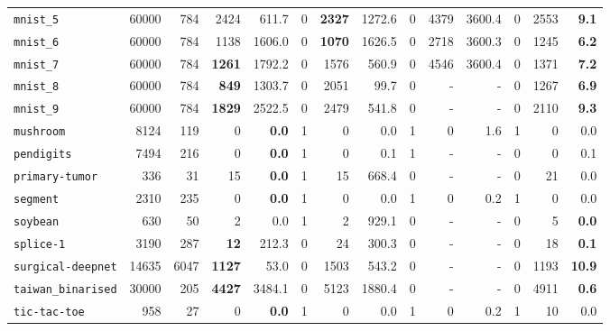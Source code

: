 \begin{tabular}{lccrrrrrrrrrrr}
\texttt{mnist\_5} & \multicolumn{1}{r}{60000} & \multicolumn{1}{r}{784}  & 2424 & 611.7 & 0 & \textbf{2327} & 1272.6 & 0 & 4379 & 3600.4 & 0 & 2553 & \textbf{9.1}\\
\texttt{mnist\_6} & \multicolumn{1}{r}{60000} & \multicolumn{1}{r}{784}  & 1138 & 1606.0 & 0 & \textbf{1070} & 1626.5 & 0 & 2718 & 3600.3 & 0 & 1245 & \textbf{6.2}\\
\texttt{mnist\_7} & \multicolumn{1}{r}{60000} & \multicolumn{1}{r}{784}  & \textbf{1261} & 1792.2 & 0 & 1576 & 560.9 & 0 & 4546 & 3600.4 & 0 & 1371 & \textbf{7.2}\\
\texttt{mnist\_8} & \multicolumn{1}{r}{60000} & \multicolumn{1}{r}{784}  & \textbf{849} & 1303.7 & 0 & 2051 & 99.7 & 0 & - & - & 0 & 1267 & \textbf{6.9}\\
\texttt{mnist\_9} & \multicolumn{1}{r}{60000} & \multicolumn{1}{r}{784}  & \textbf{1829} & 2522.5 & 0 & 2479 & 541.8 & 0 & - & - & 0 & 2110 & \textbf{9.3}\\
\texttt{mushroom} & \multicolumn{1}{r}{8124} & \multicolumn{1}{r}{119}  & 0 & \textbf{0.0} & 1 & 0 & 0.0 & 1 & 0 & 1.6 & 1 & 0 & 0.0\\
\texttt{pendigits} & \multicolumn{1}{r}{7494} & \multicolumn{1}{r}{216}  & 0 & \textbf{0.0} & 1 & 0 & 0.1 & 1 & - & - & 0 & 0 & 0.1\\
\texttt{primary-tumor} & \multicolumn{1}{r}{336} & \multicolumn{1}{r}{31}  & 15 & \textbf{0.0} & 1 & 15 & 668.4 & 0 & - & - & 0 & 21 & 0.0\\
\texttt{segment} & \multicolumn{1}{r}{2310} & \multicolumn{1}{r}{235}  & 0 & \textbf{0.0} & 1 & 0 & 0.0 & 1 & 0 & 0.2 & 1 & 0 & 0.0\\
\texttt{soybean} & \multicolumn{1}{r}{630} & \multicolumn{1}{r}{50}  & 2 & 0.0 & 1 & 2 & 929.1 & 0 & - & - & 0 & 5 & \textbf{0.0}\\
\texttt{splice-1} & \multicolumn{1}{r}{3190} & \multicolumn{1}{r}{287}  & \textbf{12} & 212.3 & 0 & 24 & 300.3 & 0 & - & - & 0 & 18 & \textbf{0.1}\\
\texttt{surgical-deepnet} & \multicolumn{1}{r}{14635} & \multicolumn{1}{r}{6047}  & \textbf{1127} & 53.0 & 0 & 1503 & 543.2 & 0 & - & - & 0 & 1193 & \textbf{10.9}\\
\texttt{taiwan\_binarised} & \multicolumn{1}{r}{30000} & \multicolumn{1}{r}{205}  & \textbf{4427} & 3484.1 & 0 & 5123 & 1880.4 & 0 & - & - & 0 & 4911 & \textbf{0.6}\\
\texttt{tic-tac-toe} & \multicolumn{1}{r}{958} & \multicolumn{1}{r}{27}  & 0 & \textbf{0.0} & 1 & 0 & 0.0 & 1 & 0 & 0.2 & 1 & 10 & 0.0\\

\end{tabular}
